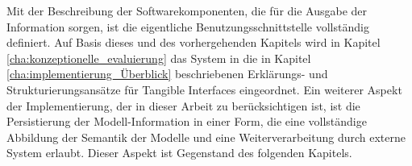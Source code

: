 Mit der Beschreibung der Softwarekomponenten, die für die Ausgabe der Information sorgen, ist die eigentliche Benutzungsschnittstelle vollständig definiert. Auf Basis dieses und des vorhergehenden Kapitels wird in Kapitel \ref{cha:konzeptionelle_evaluierung} das System in die in Kapitel \ref{cha:implementierung_Überblick} beschriebenen Erklärungs- und Strukturierungsansätze für Tangible Interfaces eingeordnet. Ein weiterer Aspekt der Implementierung, der in dieser Arbeit zu berücksichtigen ist, ist die Persistierung der Modell-Information in einer Form, die eine vollständige Abbildung der Semantik der Modelle und eine Weiterverarbeitung durch externe System erlaubt. Dieser Aspekt ist Gegenstand des folgenden Kapitels.

